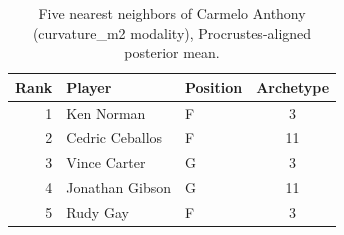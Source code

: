 \begin{table}[htbp]
  \centering\small
  \begin{tabular}{rllc}
    \toprule
    Rank & Player & Position & Archetype \\
    \midrule
    1 & Ken Norman & F & 3 \\
    2 & Cedric Ceballos & F & 11 \\
    3 & Vince Carter & G & 3 \\
    4 & Jonathan Gibson & G & 11 \\
    5 & Rudy Gay & F & 3 \\
    \bottomrule
  \end{tabular}
  \caption{Five nearest neighbors of Carmelo Anthony (curvature_m2 modality), Procrustes-aligned posterior mean.}
  \label{tab:Carmelo_Anthony_neighbors_curvature_m2}
\end{table}

